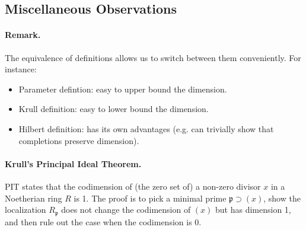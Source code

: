 \subsection{Miscellaneous Observations}
\paragraph{Remark.} The equivalence of definitions allows us to switch between them conveniently. For instance:
\begin{itemize}
    \item Parameter defintion: easy to upper bound the dimension.
    \item Krull definition: easy to lower bound the dimension.
    \item Hilbert definition: has its own advantages (e.g. can trivially show that completions preserve dimension).
\end{itemize}

\paragraph{Krull's Principal Ideal Theorem.} PIT states that the codimension of (the zero set of) a non-zero divisor $x$ in a Noetherian ring $R$ is 1. The proof is to pick a minimal prime $\mathfrak p \supset (x)$, show the localization $R_{\mathfrak p}$ does not change the codimension of $(x)$ but has dimension 1, and then rule out the case when the codimension is 0.


